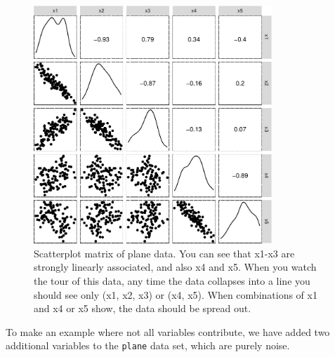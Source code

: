 \documentclass[
  letterpaper,
]{krantz}
\begin{document}
\begin{figure}[H]

{\centering \includegraphics[width=0.8\textwidth,height=\textheight]{3-intro-dimred_files/figure-pdf/fig-plane-scatmat-1.pdf}

}

\caption{\label{fig-plane-scatmat}Scatterplot matrix of plane data. You
can see that x1-x3 are strongly linearly associated, and also x4 and x5.
When you watch the tour of this data, any time the data collapses into a
line you should see only (x1, x2, x3) or (x4, x5). When combinations of
x1 and x4 or x5 show, the data should be spread out.}

\end{figure}

To make an example where not all variables contribute, we have added two
additional variables to the \texttt{plane} data set, which are purely
noise.
\end{document}
